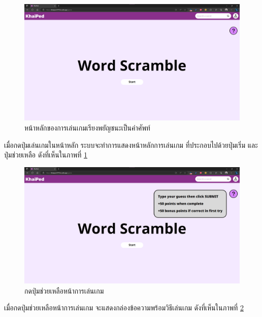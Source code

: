 \documentclass[12pt,oneside,openright,a4paper]{cpe-thai-project}
\begin{document}
\pagebreak
\begin{figure}[!h]\centering
	\includegraphics[width=\textwidth, keepaspectratio=true]{image/chap4/UI/game/game.png}
	\caption{{หน้าหลักของการเล่นเกมเรียงพยัญชนะเป็นคำศัพท์}}\label{fig:chap4UIGame}
\end{figure}
\hspace{1cm}
เมื่อกดปุ่มเล่นเกมในหน้าหลัก ระบบจะทำการแสดงหน้าหลักการเล่นเกม ที่ประกอบไปด้วยปุ่มเริ่ม และปุ่มช่วยเหลือ
ดังที่เห็นในภาพที่ \ref{fig:chap4UIGame}

\begin{figure}[!h]\centering
	\includegraphics[width=\textwidth, keepaspectratio=true]{image/chap4/UI/game/help.png}
	\caption{{กดปุ่มช่วยเหลือหน้าการเล่นเกม}}\label{fig:chap4UIGameHelp}
\end{figure}
\hspace{1cm}
เมื่อกดปุ่มช่วยเหลือหน้าการเล่นเกม จะแสดงกล่องข้อความพร้อมวิธีเล่นเกม ดังที่เห็นในภาพที่ \ref{fig:chap4UIGameHelp}
\end{document}
